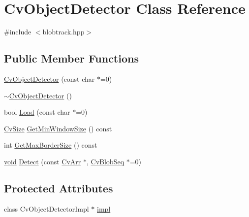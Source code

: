 \hypertarget{classCvObjectDetector}{\section{Cv\-Object\-Detector Class Reference}
\label{classCvObjectDetector}
}


{\ttfamily \#include $<$blobtrack.\-hpp$>$}

\subsection*{Public Member Functions}
\begin{DoxyCompactItemize}
\item 
\hyperlink{classCvObjectDetector_a24bfc84c1ddfac308118d711a0e52930}{Cv\-Object\-Detector} (const char $\ast$=0)
\item 
\hyperlink{classCvObjectDetector_a5893045e11584cf15caa7947c72c5601}{$\sim$\-Cv\-Object\-Detector} ()
\item 
bool \hyperlink{classCvObjectDetector_aed7c992906d06e8b6f97410a0b514937}{Load} (const char $\ast$=0)
\item 
\hyperlink{structCvSize}{Cv\-Size} \hyperlink{classCvObjectDetector_a29c1fee553bbe9289949706e1e21439e}{Get\-Min\-Window\-Size} () const 
\item 
int \hyperlink{classCvObjectDetector_af8e84ed7e3729aeec655987ef7060160}{Get\-Max\-Border\-Size} () const 
\item 
\hyperlink{legacy_8hpp_a8bb47f092d473522721002c86c13b94e}{void} \hyperlink{classCvObjectDetector_a477b21168748caf033324947669a21d3}{Detect} (const \hyperlink{core_2types__c_8h_ac5046bc0456e9295d80b37774384798c}{Cv\-Arr} $\ast$, \hyperlink{classCvBlobSeq}{Cv\-Blob\-Seq} $\ast$=0)
\end{DoxyCompactItemize}
\subsection*{Protected Attributes}
\begin{DoxyCompactItemize}
\item 
class Cv\-Object\-Detector\-Impl $\ast$ \hyperlink{classCvObjectDetector_a57854d8d18dfffbbceda386025aa150d}{impl}
\end{DoxyCompactItemize}


